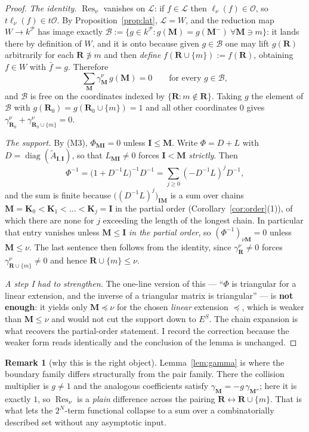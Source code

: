 \documentclass[11pt]{article}
\theoremstyle{definition}
\newtheorem{rem}[thm]{Remark}
\newcommand{\At}{\widetilde{A}}
\newcommand{\bM}{\mathbf{M}}
\newcommand{\bI}{\mathbf{I}}
\newcommand{\bR}{\mathbf{R}}
\newcommand{\bK}{\mathbf{K}}
\newcommand{\Lat}{\mathcal{L}}
\newcommand{\ES}{E^{S}}
\begin{document}
\begin{proof}
\emph{The identity.}  $\operatorname{Res}_\nu$ vanishes on $\Lat$: if $f\in\Lat$
then $\ell_\nu(f)\in\mathcal{O}$, so $t\ell_\nu(f)\in t\mathcal{O}$.  By
Proposition~\ref{prop:lat}, $\Lat=W$, and the reduction map
$W\to k^{\mathcal{P}}$ has image exactly
$\mathcal{B}:=\{g\in k^{\mathcal{P}}:g(\bM)=g(\bM^{-})\ \forall\bM\ni m\}$: it
lands there by definition of $W$, and it is onto because given $g\in\mathcal{B}$
one may lift $g(\bR)$ arbitrarily for each $\bR\not\ni m$ and then \emph{define}
$f(\bR\cup\{m\}):=f(\bR)$, obtaining $f\in W$ with $\bar f=g$.  Therefore
\[
  \sum_{\bM}\gamma^{\nu}_{\bM}\,g(\bM)=0\qquad\text{for every }g\in\mathcal{B},
\]
and $\mathcal{B}$ is free on the coordinates indexed by $\{\bR:m\notin\bR\}$.
Taking $g$ the element of $\mathcal{B}$ with
$g(\bR_0)=g(\bR_0\cup\{m\})=1$ and all other coordinates $0$ gives
$\gamma^{\nu}_{\bR_0}+\gamma^{\nu}_{\bR_0\cup\{m\}}=0$.

\emph{The support.}  By (M3), $\Phi_{\bM\bI}=0$ unless $\bI\le\bM$.  Write
$\Phi=D+L$ with $D=\operatorname{diag}(\At_{\bI,\bI})$, so that
$L_{\bM\bI}\ne0$ forces $\bI<\bM$ \emph{strictly}.  Then
\[
  \Phi^{-1}=\bigl(1+D^{-1}L\bigr)^{-1}D^{-1}
  =\sum_{j\ge0}(-D^{-1}L)^{j}D^{-1},
\]
and the sum is finite because $\bigl((D^{-1}L)^{j}\bigr)_{\bI\bM}$ is a sum over
chains $\bM=\bK_0<\bK_1<\dots<\bK_j=\bI$ in the partial order
(Corollary~\ref{cor:order}(1)), of which there are none for $j$ exceeding the
length of the longest chain.  In particular that entry vanishes unless
$\bM\le\bI$ \emph{in the partial order}, so $(\Phi^{-1})_{\nu\bM}=0$ unless
$\bM\le\nu$.  The last sentence then follows from the identity, since
$\gamma^\nu_\bR\ne0$ forces $\gamma^\nu_{\bR\cup\{m\}}\ne0$ and hence
$\bR\cup\{m\}\le\nu$.

\emph{A step I had to strengthen.}  The one-line version of this --- ``$\Phi$ is
triangular for a linear extension, and the inverse of a triangular matrix is
triangular'' --- is \textbf{not enough}: it yields only $\bM\preceq\nu$ for the
chosen \emph{linear} extension $\preceq$, which is weaker than $\bM\le\nu$ and
would not cut the support down to $\ES$.  The chain expansion is what recovers
the partial-order statement.  I record the correction because the weaker form
reads identically and the conclusion of the lemma is unchanged.
\end{proof}

\begin{rem}[why this is the right object]
Lemma~\ref{lem:gamma} is where the boundary family differs structurally from the
pair family.  There the collision multiplier is $g\ne1$ and the analogous
coefficients satisfy $\gamma_{\bM}=-g\,\gamma_{\bM''}$; here it is exactly $1$,
so $\operatorname{Res}_\nu$ is a \emph{plain} difference across the pairing
$\bR\leftrightarrow\bR\cup\{m\}$.  That is what lets the $2^{N}$-term functional
collapse to a sum over a combinatorially described set without any asymptotic
input.
\end{rem}
\end{document}
